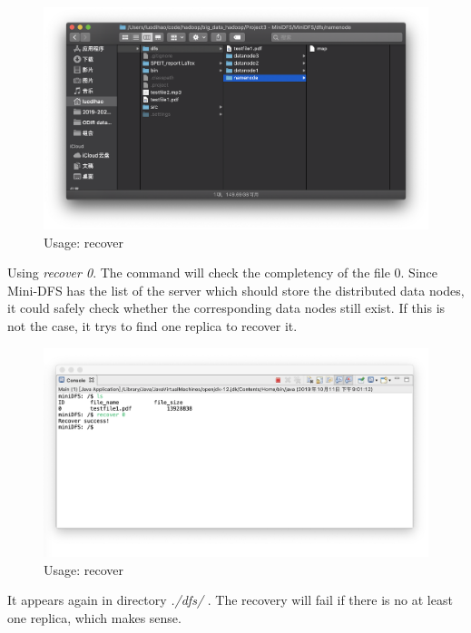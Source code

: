 \documentclass[10pt]{article}
\begin{document}
\begin{figure}[H]
\centerline{\includegraphics[width = 1\textwidth]{screenshot//recover_01.png}}
\caption{Usage: recover}
\end{figure}

Using \textit{recover 0}. The command will check the completency of the file 0.
Since Mini-DFS has the list of the server which should store the distributed data nodes,
it could safely check whether the corresponding data nodes still exist. If this is
not the case, it trys to find one replica to recover it.

\begin{figure}[H]
\centerline{\includegraphics[width = 1\textwidth]{screenshot//recover_02.png}}
\caption{Usage: recover}
\end{figure}

It appears again in directory \textit{./dfs/} . The recovery will fail if there is no at least one replica, which makes sense.
\end{document}
